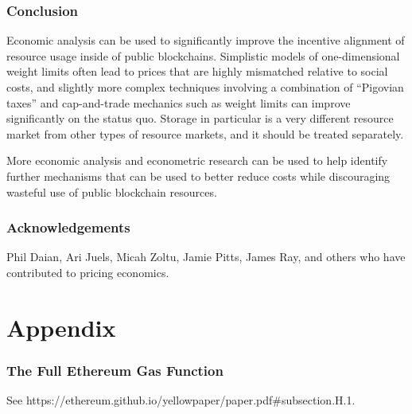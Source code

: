 \documentclass[12pt, final]{article}
\begin{document}
\section{Conclusion}

Economic analysis can be used to significantly improve the incentive alignment of resource usage inside of public blockchains. Simplistic models of one-dimensional weight limits often lead to prices that are highly mismatched relative to social costs, and slightly more complex techniques involving a combination of ``Pigovian taxes'' and cap-and-trade mechanics such as weight limits can improve significantly on the status quo. Storage in particular is a very different resource market from other types of resource markets, and it should be treated separately.

More economic analysis and econometric research can be used to help identify further mechanisms that can be used to better reduce costs while discouraging wasteful use of public blockchain resources.

\section{Acknowledgements}

Phil Daian, Ari Juels, Micah Zoltu, Jamie Pitts, James Ray, and others who have contributed to pricing economics.





\newpage
\appendix
\part*{Appendix}











\section{The Full Ethereum Gas Function}
\label{appendix:gasfunction}
See https://ethereum.github.io/yellowpaper/paper.pdf#subsection.H.1.
\end{document}
